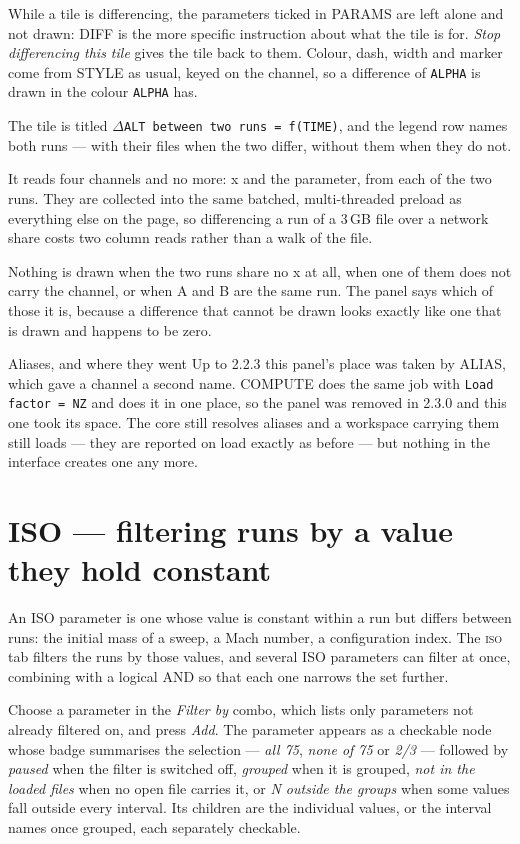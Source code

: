 \documentclass[11pt,a4paper,oneside]{report}
\newcommand{\code}[1]{\texttt{#1}}
\newcommand{\tab}[1]{\textsc{#1}}
\begin{document}
While a tile is differencing, the parameters ticked in PARAMS are left alone and
not drawn: DIFF is the more specific instruction about what the tile is for.
\emph{Stop differencing this tile} gives the tile back to them. Colour, dash,
width and marker come from STYLE as usual, keyed on the channel, so a difference
of \code{ALPHA} is drawn in the colour \code{ALPHA} has.

The tile is titled $\Delta$\code{ALT between two runs = f(TIME)}, and the legend
row names both runs --- with their files when the two differ, without them when
they do not.

It reads four channels and no more: x and the parameter, from each of the two
runs. They are collected into the same batched, multi-threaded preload as
everything else on the page, so differencing a run of a 3\,GB file over a network
share costs two column reads rather than a walk of the file.

Nothing is drawn when the two runs share no x at all, when one of them does not
carry the channel, or when A and B are the same run. The panel says which of
those it is, because a difference that cannot be drawn looks exactly like one
that is drawn and happens to be zero.

\begin{aoenote}{Aliases, and where they went}
Up to 2.2.3 this panel's place was taken by ALIAS, which gave a channel a second
name. COMPUTE does the same job with \code{Load factor = NZ} and does it in one
place, so the panel was removed in 2.3.0 and this one took its space. The core
still resolves aliases and a workspace carrying them still loads --- they are
reported on load exactly as before --- but nothing in the interface creates one
any more.
\end{aoenote}

\section{ISO --- filtering runs by a value they hold constant}
\label{sec:iso}

An ISO parameter is one whose value is constant within a run but differs between
runs: the initial mass of a sweep, a Mach number, a configuration index. The
\tab{iso} tab filters the runs by those values, and several ISO parameters can
filter at once, combining with a logical AND so that each one narrows the set
further.

Choose a parameter in the \emph{Filter by} combo, which lists only parameters not
already filtered on, and press \emph{Add}. The parameter appears as a checkable
node whose badge summarises the selection --- \emph{all 75}, \emph{none of 75} or
\emph{2/3} --- followed by \emph{paused} when the filter is switched off,
\emph{grouped} when it is grouped, \emph{not in the loaded files} when no open
file carries it, or \emph{N outside the groups} when some values fall outside
every interval. Its children are the individual values, or the interval names
once grouped, each separately checkable.
\end{document}
